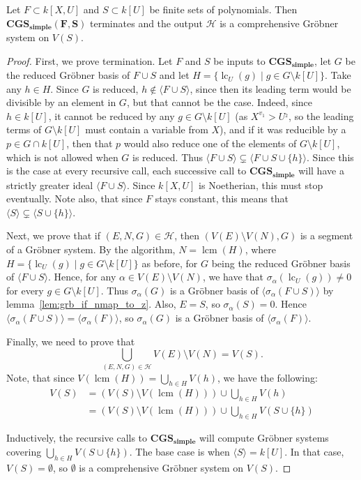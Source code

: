 \documentclass[a4paper, 12pt]{article}
\DeclareMathOperator{\LC}{lc}
\DeclareMathOperator{\lcm}{lcm}
\theoremstyle{changedot}
\theoremstyle{changedotbreak}
\theoremstyle{nonumberplain}
\newtheorem{proof}{Proof}
\begin{document}
\begin{theorem}
  Let $F \subset k[X, U]$ and $S \subset k[U]$ be finite sets of polynomials. Then $\mathbf{CGS_{simple}(F, S)}$ terminates and the output $\mathcal H$ is a comprehensive Gröbner system on $V(S)$.
\end{theorem}
\begin{proof}
  First, we prove termination. Let $F$ and $S$ be inputs to $\mathbf{CGS_{simple}}$, let $G$ be the reduced Gröbner basis of $F \cup S$ and let $H = \{\LC_{U}(g) \mid g \in G \setminus k[U]\}$. Take any $h \in H$. Since $G$ is reduced, $h \notin \langle F \cup S \rangle$, since then its leading term would be divisible by an element in $G$, but that cannot be the case. Indeed, since $h \in k[U]$, it cannot be reduced by any $g \in G \setminus k[U]$ (as $X^{v_{1}} > U^{_{2}}$, so the leading terms of $G \setminus k[U]$ must contain a variable from $X$), and if it was reducible by a $p \in G \cap k[U]$, then that $p$ would also reduce one of the elements of $G \setminus k[U]$, which is not allowed when $G$ is reduced. Thus $\langle F \cup S \rangle \subsetneq \langle F \cup S \cup \{h\} \rangle$. Since this is the case at every recursive call, each successive call to $\mathbf{CGS_{simple}}$ will have a strictly greater ideal $\langle F \cup S \rangle$. Since $k[X, U]$ is Noetherian, this must stop eventually. Note also, that since $F$ stays constant, this means that $\langle S \rangle \subsetneq \langle S \cup \{h\} \rangle$.

  Next, we prove that if $(E, N, G) \in \mathcal H$, then $(V(E) \setminus V(N), G)$ is a segment of a Gröbner system. By the algorithm, $N = \lcm(H)$, where $H = \{\LC_{U}(g) \mid g \in G \setminus k[U]\}$ as before, for $G$ being the reduced Gröbner basis of $\langle F \cup S \rangle$. Hence, for any $\alpha \in V(E) \setminus V(N)$, we have that $\sigma_{\alpha}(\LC_{U}(g)) \neq 0$ for every $g \in G \setminus k[U]$. Thus $\sigma_{\alpha}(G)$ is a Gröbner basis of $\langle \sigma_{\alpha}(F \cup S) \rangle$ by lemma~\ref{lem:grb_if_nmap_to_z}. Also, $E = S$, so $\sigma_{\alpha}(S) = 0$. Hence $\langle \sigma_{\alpha}(F \cup S) \rangle = \langle \sigma_{\alpha}(F) \rangle$, so $\sigma_{\alpha}(G)$ is a Gröbner basis of $\langle \sigma_{\alpha}(F) \rangle$.

  Finally, we need to prove that \[\bigcup_{(E, N, G) \in \mathcal H} V(E) \setminus V(N) = V(S).\]
  Note, that since $V(\lcm(H)) = \bigcup_{h \in H} V(h)$, we have the following:
  \begin{align*}
    V(S) &= (V(S) \setminus V(\lcm(H))) \cup \bigcup_{h \in H} V(h) \\
    &= (V(S) \setminus V(\lcm(H))) \cup \bigcup_{h \in H} V(S \cup \{h\})
  \end{align*}

  Inductively, the recursive calls to $\mathbf{CGS_{simple}}$ will compute Gröbner systems covering $\bigcup_{h \in H} V(S \cup \{h\})$. The base case is when $\langle S \rangle = k[U]$. In that case, $V(S) = \emptyset$, so $\emptyset$ is a comprehensive Gröbner system on $V(S)$.
\end{proof}
\end{document}
